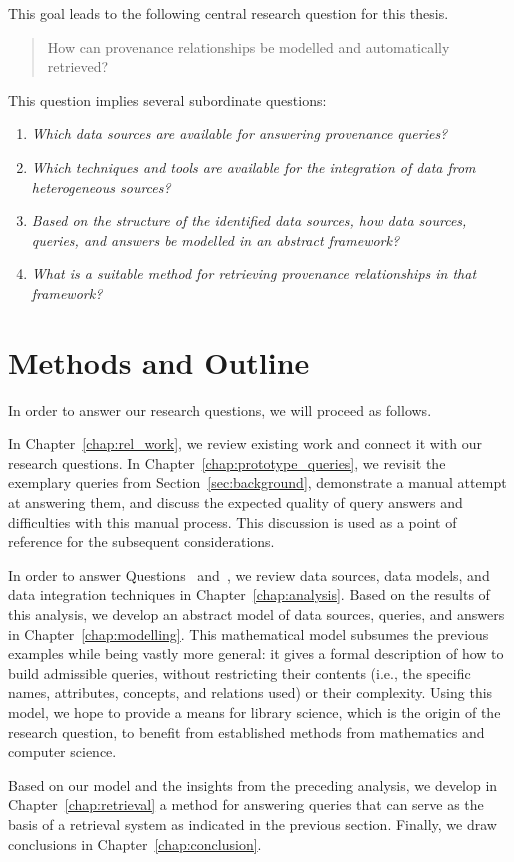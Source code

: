 This goal leads to the following
central research question for this thesis.
%
\begin{quote}
  \begin{itshape}
    How can provenance relationships be modelled and automatically retrieved?
  \end{itshape}
\end{quote}
%
This question implies several subordinate questions:
%
\begin{enumerate}
  \item[\subquestion{1}]
    \emph{Which data sources are available for answering provenance queries?}
  \item[\subquestion{2}]
    \emph{Which techniques and tools are available for the integration
    of data from heterogeneous sources?}
  \item[\subquestion{3}]
    \emph{Based on the structure of the identified data sources,
    how data sources, queries, and answers be modelled in an abstract framework?}
  \item[\subquestion{4}]
    \emph{What is a suitable method for retrieving provenance relationships
    in that framework?}
\end{enumerate}


\section{Methods and Outline}
\label{sec:methods}

In order to answer our research questions, we will proceed as follows.

In Chapter~\ref{chap:rel_work}, we review existing work 
and connect it with our research questions.
In Chapter~\ref{chap:prototype_queries}, we revisit
the exemplary queries from Section~\ref{sec:background},
demonstrate a manual attempt at answering them,
and discuss the expected quality of query answers and difficulties with this manual process.
This discussion is used as a point of reference for the subsequent considerations.

In order to answer Questions~ and~, we review
data sources, data models, and data integration techniques in Chapter~\ref{chap:analysis}.
Based on the results of this analysis, we develop an abstract model of
data sources, queries, and answers in Chapter~\ref{chap:modelling}.
This mathematical model subsumes the previous examples
while being vastly more general: it gives a formal description of how to
build admissible queries, without restricting their contents
(i.e., the specific names, attributes, concepts, and relations used)
or their complexity. Using this model, we hope to provide a means
for library science, which is the origin of the research question,
to benefit from established methods from mathematics and computer science.

Based on our model and the insights from the preceding analysis,
we develop in Chapter~\ref{chap:retrieval}
a method for answering queries that can serve as the basis of a retrieval system
as indicated in the previous section.
Finally, we draw conclusions in Chapter~\ref{chap:conclusion}.

